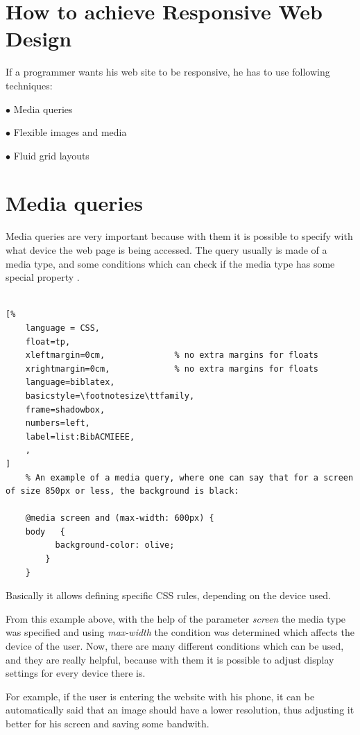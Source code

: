 \section{How to achieve Responsive Web Design}

If a programmer wants his web site to be responsive, he has to use 
following techniques:

$\bullet$ Media queries 

$\bullet$ Flexible images and media

$\bullet$ Fluid grid layouts



\section{Media queries}

Media queries are very important because with them it is possible to specify 
with what device the web page is being accessed. The query usually is made of
a media type, and some conditions which can check if the media type has some special
property \parencite{4}.
\\
\\
\begin{lstlisting}[%
    language = CSS, 
    float=tp,
    xleftmargin=0cm,              % no extra margins for floats
    xrightmargin=0cm,             % no extra margins for floats
    language=biblatex,
    basicstyle=\footnotesize\ttfamily,
    frame=shadowbox,
    numbers=left,
    label=list:BibACMIEEE,
    ,
]
    % An example of a media query, where one can say that for a screen of size 850px or less, the background is black:

    @media screen and (max-width: 600px) {
    body   {
          background-color: olive;
        }
    }
\end{lstlisting}
Basically it allows defining specific CSS rules, depending on the device used.

From this example above, with the help of the parameter \emph{screen}
the media type was specified and using \emph{max-width} the condition was determined which
affects the device of the user. Now, there are many different conditions which
can be used, and they are really helpful, because with them it is possible to adjust 
display settings for every device there is. 

For example, if the user is entering the website with his phone, it can be automatically said that an image should have a lower resolution,
thus adjusting it better for his screen and saving some bandwith.

